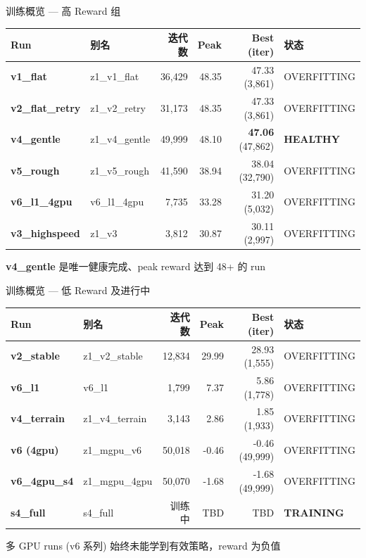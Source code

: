 \documentclass[aspectratio=169, 10pt, xcolor=dvipsnames]{beamer}
\begin{document}
\begin{frame}{训练概览 — 高 Reward 组}
  \centering\scriptsize
  \begin{tabular}{>{\bfseries}l l r r r l}
    \toprule
    Run & 别名 & 迭代数 & Peak & Best (iter) & 状态 \\
    \midrule
    \rowcolor{bestrow}
    v1\_flat & z1\_v1\_flat & 36,429 & 48.35 & 47.33 (3,861) & \textcolor{overfitred}{OVERFITTING} \\
    \rowcolor{bestrow}
    v2\_flat\_retry & z1\_v2\_retry & 31,173 & 48.35 & 47.33 (3,861) & \textcolor{overfitred}{OVERFITTING} \\
    \rowcolor{bestrow}
    v4\_gentle & z1\_v4\_gentle & 49,999 & 48.10 & \textbf{47.06} (47,862) & \textcolor{healthgreen}{\textbf{HEALTHY}} \\
    v5\_rough & z1\_v5\_rough & 41,590 & 38.94 & 38.04 (32,790) & \textcolor{overfitred}{OVERFITTING} \\
    v6\_l1\_4gpu & v6\_l1\_4gpu & 7,735 & 33.28 & 31.20 (5,032) & \textcolor{overfitred}{OVERFITTING} \\
    v3\_highspeed & z1\_v3 & 3,812 & 30.87 & 30.11 (2,997) & \textcolor{overfitred}{OVERFITTING} \\
    \bottomrule
  \end{tabular}

  \vspace{0.4cm}
  \small\textcolor{healthgreen}{\faCheckCircle} \textbf{v4\_gentle} 是唯一健康完成、peak reward 达到 48+ 的 run
\end{frame}

\begin{frame}{训练概览 — 低 Reward 及进行中}
  \centering\scriptsize
  \begin{tabular}{>{\bfseries}l l r r r l}
    \toprule
    Run & 别名 & 迭代数 & Peak & Best (iter) & 状态 \\
    \midrule
    v2\_stable & z1\_v2\_stable & 12,834 & 29.99 & 28.93 (1,555) & \textcolor{overfitred}{OVERFITTING} \\
    v6\_l1 & v6\_l1 & 1,799 & 7.37 & 5.86 (1,778) & \textcolor{overfitred}{OVERFITTING} \\
    v4\_terrain & z1\_v4\_terrain & 3,143 & 2.86 & 1.85 (1,933) & \textcolor{overfitred}{OVERFITTING} \\
    v6 (4gpu) & z1\_mgpu\_v6 & 50,018 & -0.46 & -0.46 (49,999) & \textcolor{overfitred}{OVERFITTING} \\
    v6\_4gpu\_s4 & z1\_mgpu\_4gpu & 50,070 & -1.68 & -1.68 (49,999) & \textcolor{overfitred}{OVERFITTING} \\
    \midrule
    \textcolor{trainblue}{\textbf{s4\_full}} & \textcolor{trainblue}{s4\_full} & \textcolor{trainblue}{训练中} & \textcolor{trainblue}{TBD} & \textcolor{trainblue}{TBD} & \textcolor{trainblue}{\textbf{TRAINING}} \\
    \bottomrule
  \end{tabular}

  \vspace{0.4cm}
  \small 多 GPU runs (v6 系列) 始终未能学到有效策略，reward 为负值
\end{frame}
\end{document}
